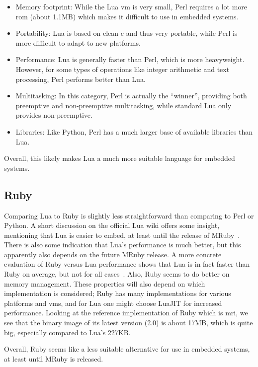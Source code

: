 \begin{itemize}
	\item{Memory footprint:} While the Lua \gls{vm} is very small, Perl requires a lot more \gls{rom} (about 1.1MB) which makes it difficult to use in embedded systems.
	\item{Portability:} Lua is based on \gls{clean-c} and thus very portable, while Perl is more difficult to adapt to new platforms.
	\item{Performance:} Lua is generally faster than Perl, which is more heavyweight. However, for some types of operations like integer arithmetic and text processing, Perl performs better than Lua.
	\item{Multitasking:} In this category, Perl is actually the ``winner'', providing both preemptive and non-preemptive multitasking, while standard Lua only provides non-preemptive.
	\item{Libraries:} Like Python, Perl has a much larger base of available libraries than Lua.
\end{itemize}

\noindent
Overall, this likely makes Lua a much more suitable language for embedded systems.

\subsection{Ruby}
\label{sec:lua_vs_ruby}
Comparing Lua to Ruby is slightly less straightforward than comparing to Perl or Python. A short discussion on the official Lua wiki offers some insight, mentioning that Lua is easier to embed, at least until the release of MRuby~\cite{website:lua_wiki_ruby}. There is also some indication that Lua's performance is much better, but this apparently also depends on the future MRuby release. A more concrete evaluation of Ruby versus Lua performance shows that Lua is in fact faster than Ruby on average, but not for all cases~\cite{website:computer_language_benchmarks_game}. Also, Ruby seems to do better on memory management. These properties will also depend on which implementation is considered; Ruby has many implementations for various platforms and \glspl{vm}, and for Lua one might choose LuaJIT for increased performance. Looking at the reference implementation of Ruby which is \gls{mri}, we see that the binary image of its latest version (2.0) is about 17MB, which is quite big, especially compared to Lua's 227KB.

\noindent
Overall, Ruby seems like a less suitable alternative for use in embedded systems, at least until MRuby is released.

